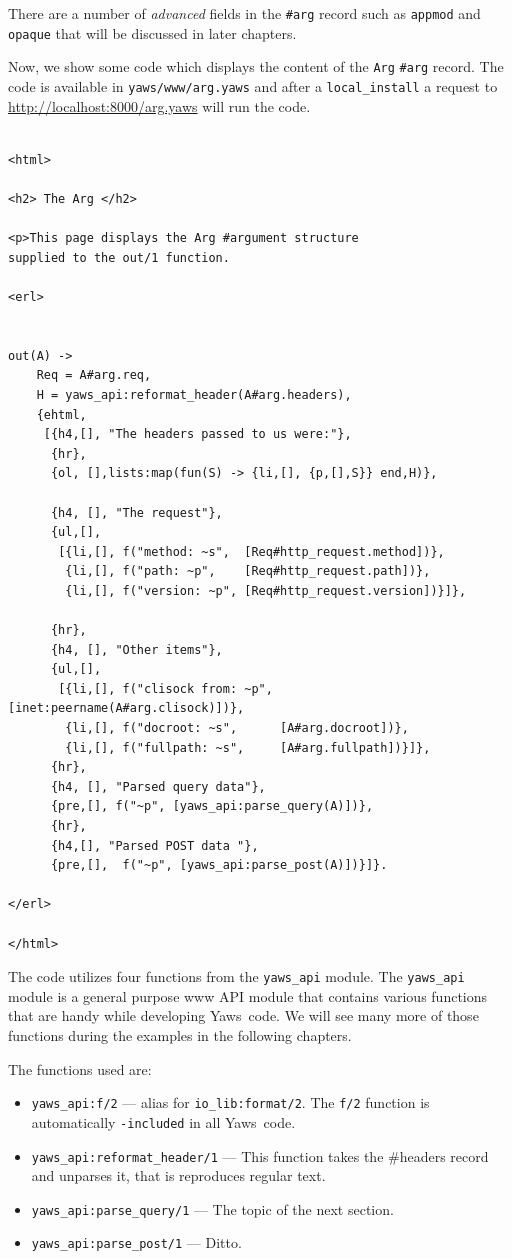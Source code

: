 \documentclass[11pt,oneside,english]{book}
\newcommand{\Yaws}            %
        {{\sc Yaws}}
\begin{document}
There are a number of \textit{advanced} fields in the \verb+#arg+
record such as \verb+appmod+ and \verb+opaque+ that will be discussed
in later chapters.

Now, we show some code which displays the content of the \verb+Arg+
\verb+#arg+ record.  The code is available in \verb+yaws/www/arg.yaws+
and after a \verb+local_install+ a request to
\url{http://localhost:8000/arg.yaws} will run the code.

\begin{verbatim}

<html>

<h2> The Arg </h2>

<p>This page displays the Arg #argument structure
supplied to the out/1 function.

<erl>


out(A) ->
    Req = A#arg.req,
    H = yaws_api:reformat_header(A#arg.headers),
    {ehtml,
     [{h4,[], "The headers passed to us were:"},
      {hr},
      {ol, [],lists:map(fun(S) -> {li,[], {p,[],S}} end,H)},

      {h4, [], "The request"},
      {ul,[],
       [{li,[], f("method: ~s",  [Req#http_request.method])},
        {li,[], f("path: ~p",    [Req#http_request.path])},
        {li,[], f("version: ~p", [Req#http_request.version])}]},

      {hr},
      {h4, [], "Other items"},
      {ul,[],
       [{li,[], f("clisock from: ~p", [inet:peername(A#arg.clisock)])},
        {li,[], f("docroot: ~s",      [A#arg.docroot])},
        {li,[], f("fullpath: ~s",     [A#arg.fullpath])}]},
      {hr},
      {h4, [], "Parsed query data"},
      {pre,[], f("~p", [yaws_api:parse_query(A)])},
      {hr},
      {h4,[], "Parsed POST data "},
      {pre,[],  f("~p", [yaws_api:parse_post(A)])}]}.

</erl>

</html>

\end{verbatim}

The code utilizes four functions from the \verb+yaws_api+ module.  The
\verb+yaws_api+ module is a general purpose www API module that
contains various functions that are handy while developing
\Yaws\ code. We will see many more of those functions during the
examples in the following chapters.

The functions used are:

\begin{itemize}
\item \verb+yaws_api:f/2+ --- alias for \verb+io_lib:format/2+. The
  \verb+f/2+ function is automatically \verb+-included+ in all
  \Yaws\ code.
\item \verb+yaws_api:reformat_header/1+ --- This function takes the
  \#headers record and unparses it, that is reproduces regular text.
\item \verb+yaws_api:parse_query/1+ --- The topic of the next section.
\item \verb+yaws_api:parse_post/1+ --- Ditto.
\end{itemize}
\end{document}
